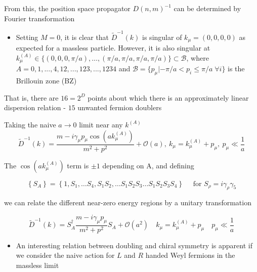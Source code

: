 From this, the position space propagator $D(n,m)^{-1}$ can be determined by Fourier transformation

\begin{itemize}
  \item Setting \(M=0\), it is clear that \(\tilde{D}^{-1}(k)\) is singular of \(k_{\mu}=(0,0,0,0)\) as expected for a massless particle. However, it is also singular at $k_\mu^{(A)} \in \{ (0,0,0,\pi/a), \ldots,(\pi/a, \pi/a, \pi/a, \pi/a)\} \subset \mathcal{B}$, where $A = 0, 1, ..., 4, 12, ..., 123,..., 1234$ and $\mathcal{B}=\{p_\mu | - \pi/a < p_i \leq \pi/a \; \forall i\}$ is the Brillouin zone  (BZ)
\end{itemize}

That is, there are \(16=2^{D}\) points about which there is an approximately linear dispersion relation - $15$ unwanted fermion doublers

Taking the naive $a \rightarrow 0$ limit near any $k^{(A)}$
\begin{equation}
    \tilde{D}^{-1}(k) = \frac{m - i \gamma_\mu p_\mu \cos(a k_\mu^{(A)})}{m^2 + p^2} + \mathcal{O}(a),\: k_\mu = k_\mu^{(A)} + p_\mu,\: p_\mu \ll \frac{1}{a}
\end{equation}

The \(\cos \left(a k_{\mu}^{(A)}\right)\) term is $\pm 1$ depending on A, and defining

\begin{equation}
\left\{S_{A}\right\}=\left\{1, S_{1}, \ldots S_{4}, S_{1} S_{2}, \ldots S_{1} S_{2} S_{3} \ldots S_{1} S_{2} S_{3} S_{4}\right\} \quad \text { for } S_{\rho}=i \gamma_{\rho} \gamma_{5}
\end{equation}

we can relate the different near-zero energy regions by a unitary transformation

\begin{equation}
\tilde{D}^{-1}(k)=S_{A}^{\dagger} \frac{m-i \gamma_{\mu} p_{\mu}}{m^{2}+p^{2}} S_{A}+\mathcal{O}\left(a^{2}\right) \quad k_{\mu}=k_{\mu}^{(A)}+p_{\mu} \quad p_{\mu}\ll \frac{1}{a}
\end{equation}

\begin{itemize}
  \item An interesting relation between doubling and chiral symmetry is apparent if we consider the naive action for \(L\) and \(R\) handed Weyl fermions in the massless limit
\end{itemize}

